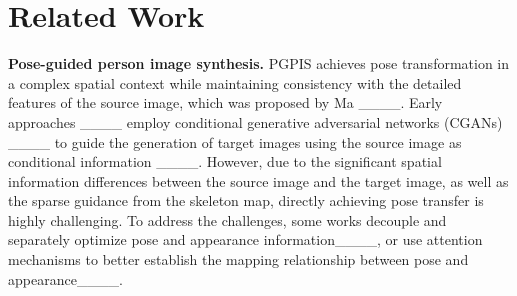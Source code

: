 \section{Related Work}
\label{sec:related_work}

\textbf{Pose-guided person image synthesis.}
PGPIS achieves pose transformation in a complex spatial context while maintaining consistency with the detailed features of the source image, which was proposed by Ma \etal  ____. 
Early approaches ____ employ conditional generative adversarial networks (CGANs)  ____ to guide the generation of target images using the source image as conditional information ____. However, due to the significant spatial information differences between the source image and the target image, as well as the sparse guidance from the skeleton map, directly achieving pose transfer is highly challenging. To address the challenges, some works decouple and separately optimize pose and appearance information____, or use attention mechanisms to better establish the mapping relationship between pose and appearance____. 

